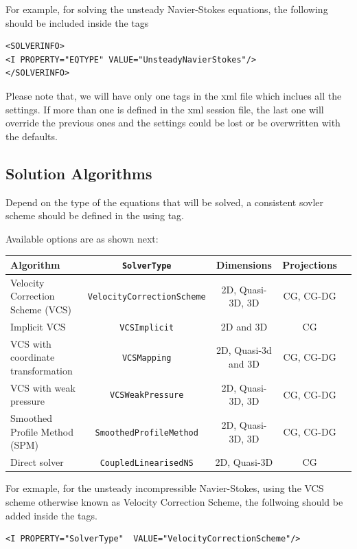 For example, for solving the unsteady Navier-Stokes equations, the following 
should be included inside the  tags

\begin{lstlisting}[style=XMLStyle]
<SOLVERINFO>
<I PROPERTY="EQTYPE" VALUE="UnsteadyNavierStokes"/>
</SOLVERINFO>
\end{lstlisting}

Please note that, we will have only one  tags in the xml file
which inclues all the settings. If more than one  is defined
in the xml session file, the last one will override the previous ones and the
settings could be lost or be overwritten with the defaults.


\subsection{Solution Algorithms}
Depend on the type of the equations that will be solved, a consistent sovler 
scheme should be defined in the  using  tag.

Available options are as shown next:
\begin{center}
\footnotesize
\begin{tabular}{lcccc}
\toprule
{Algorithm} & {\texttt{SolverType}} &{Dimensions}&{Projections} \\
\midrule
Velocity Correction Scheme (VCS) & \texttt{VelocityCorrectionScheme} & 2D, Quasi-3D, 3D & CG, CG-DG\\
Implicit VCS & \texttt{VCSImplicit} & 2D and 3D & CG\\
VCS with coordinate transformation & \texttt{VCSMapping} & 2D, Quasi-3d and 3D & CG, CG-DG\\
VCS with weak pressure & \texttt{VCSWeakPressure} & 2D, Quasi-3D, 3D & CG, CG-DG\\
Smoothed Profile Method (SPM)    & \texttt{SmoothedProfileMethod}    & 2D, Quasi-3D, 3D & CG, CG-DG\\
Direct solver & \texttt{CoupledLinearisedNS} & 2D, Quasi-3D &CG\\
\bottomrule
\end{tabular}
\end{center}

For exmaple, for the unsteady incompressible Navier-Stokes, using the VCS scheme
otherwise known as Velocity Correction Scheme, the follwoing should be added 
inside the  tags.

\begin{lstlisting}[style=XMLStyle]
<I PROPERTY="SolverType"  VALUE="VelocityCorrectionScheme"/>
\end{lstlisting}

